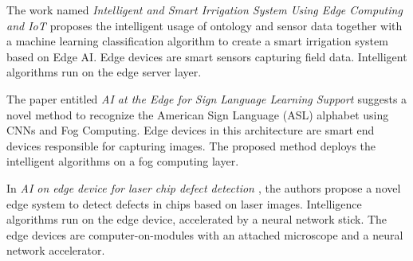 
The work named \textit{Intelligent and Smart Irrigation System Using Edge Computing and IoT \cite{munir2021intelligent}} proposes the intelligent usage of ontology and sensor data together with a machine learning classification algorithm to create a smart irrigation system based on Edge AI. Edge devices are smart sensors capturing field data. Intelligent algorithms run on the edge server layer.



The paper entitled \textit{AI at the Edge for Sign Language Learning Support \cite{battistoni2019ai}} suggests a novel method to recognize the American Sign Language (ASL) alphabet using CNNs and Fog Computing. Edge devices in this architecture are smart end devices responsible for capturing images. The proposed method deploys the intelligent algorithms on a fog computing layer.



In \textit{AI on edge device for laser chip defect detection \cite{hou2019ai}}, the authors propose a novel edge system to detect defects in chips based on laser images. Intelligence algorithms run on the edge device, accelerated by a neural network stick. The edge devices are computer-on-modules with an attached microscope and a neural network accelerator.


